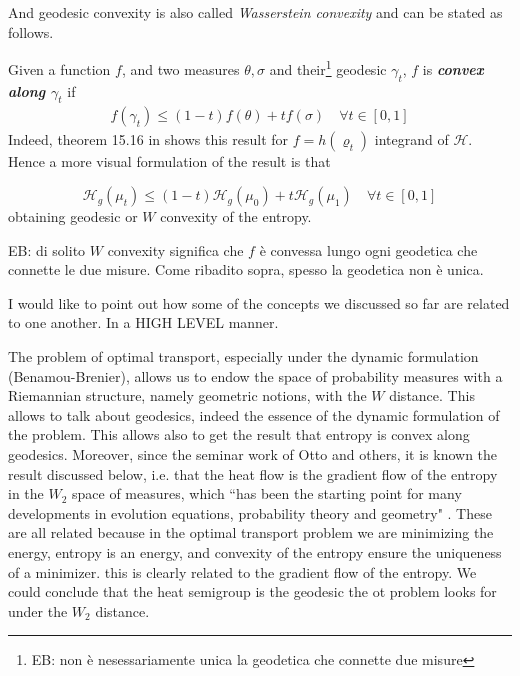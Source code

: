 \documentclass[a4paper,12pt,reqno]{amsbook}
\theoremstyle{definition} %
\newcommand{\1}{\mathbbm{1}}
\newcommand{\cH}{\mathcal{H}} %
\theoremstyle{plain}
\theoremstyle{remark}
\begin{document}
{And geodesic convexity is also called \textit{Wasserstein convexity} and can be stated as follows.

\begin{definition}[$W$ convexity]\label{def: Wconvex}
    Given a function $f$, and two measures $\theta, \sigma$ and their\footnote{EB: non è nesessariamente unica la geodetica che connette due misure} geodesic $\gamma_t$, $f$ is \textit{\textbf{convex along $\gamma_t$}} if
\begin{align*}
    f(\gamma_t)\le(1-t)f(\theta )+ tf(\sigma)\quad \forall t \in [0,1]
\end{align*}
Indeed, theorem 15.16 in \cite{brue} shows this result for $f= h(\varrho_t)$ integrand of $\cH$. Hence a more visual formulation of the result is that

\[
\cH_g(\mu_t) \le (1-t) \cH_g(\mu_0) + t \cH_g(\mu_1) \quad \forall t \in [0,1] 
\]
obtaining geodesic or $W$ convexity of the entropy.


{\color{blue}EB: di solito $W$ convexity significa che $f$ è convessa lungo ogni geodetica che connette le due misure. Come ribadito sopra, spesso la geodetica non è unica.}
\end{definition}

\begin{remark}
    I would like to point out how some of the concepts we discussed so far are related to one another. In a HIGH LEVEL manner. 
    
    The problem of optimal transport, especially under the dynamic formulation (Benamou-Brenier), allows us to endow the space of probability measures with a Riemannian structure, namely geometric notions, with the $W$ distance. This allows to talk about geodesics, indeed the essence of the dynamic formulation of the problem. This allows also to get the result that entropy is convex along geodesics. Moreover, since the seminar work of Otto and others, it is known the result discussed below, i.e. that the heat flow is the gradient flow of the entropy in the $W_2$ space of measures, which ``has been the starting point for many developments in evolution equations, probability theory and geometry" \cite{maas}. These are all related because in the optimal transport problem we are minimizing the energy, entropy is an energy, and convexity of the entropy ensure the uniqueness of a minimizer. this is clearly related to the gradient flow of the entropy. We could conclude that the heat semigroup is the geodesic the ot problem looks for under the $W_2$ distance.
    

\end{remark}}
\end{document}
